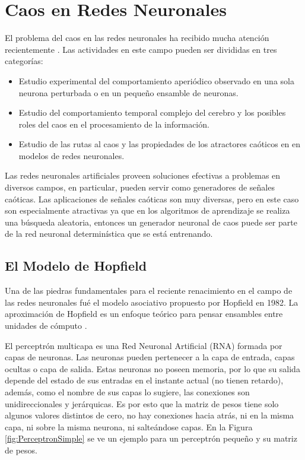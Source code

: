 \section{Caos en Redes Neuronales}
\label{sec:RNA}

El problema del caos en las redes neuronales ha recibido mucha atención recientemente \cite{Yang2003}.
Las actividades en este campo pueden ser divididas en tres categorías:
\begin{itemize}
	\item Estudio experimental del comportamiento aperiódico observado en una sola neurona perturbada o en un pequeño ensamble de neuronas.
	\item Estudio del comportamiento temporal complejo del cerebro y los posibles	roles del caos en el procesamiento de la información.
	\item Estudio de las rutas al caos y las propiedades de los atractores caóticos en en modelos de redes neuronales.
\end{itemize}

Las redes neuronales artificiales proveen soluciones efectivas a problemas en diversos campos, en particular, pueden servir como generadores de señales caóticas.
Las aplicaciones de señales caóticas son muy diversas, pero en este caso son especialmente atractivas ya que en los algoritmos de aprendizaje se realiza una búsqueda aleatoria, entonces un generador neuronal de caos puede ser parte de la red neuronal determinística que se está entrenando.

\subsection{El Modelo de Hopfield}

Una de las piedras fundamentales para el reciente renacimiento en el campo de las redes neuronales fué el modelo asociativo propuesto por Hopfield en 1982.
La aproximación de Hopfield es un enfoque teórico para pensar ensambles entre unidades de cómputo \cite{Weise2009}.

El perceptrón multicapa es una Red Neuronal Artificial (RNA) formada por capas de neuronas.
Las neuronas pueden pertenecer a la capa de entrada, capas ocultas o capa de salida.
Estas neuronas no poseen memoria, por lo que su salida depende del estado de sus entradas en el instante actual (no tienen retardo), además, como el nombre de sus capas lo sugiere, las conexiones son unidireccionales y jerárquicas.
Es por esto que la matriz de pesos tiene solo algunos valores distintos de cero, no hay conexiones hacia atrás, ni en la misma capa, ni sobre la misma neurona, ni salteándose capas.
En la Figura \ref{fig:PerceptronSimple} se ve un ejemplo para un perceptrón pequeño y su matriz de pesos.

